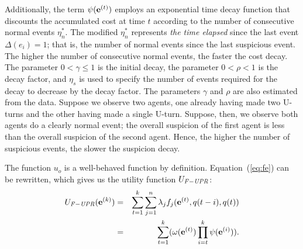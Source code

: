 Additionally, the term $\psi(\mathbf{e}^{\scriptsize(t)})$ employs an exponential time decay function that discounts the accumulated cost at time $t$ according to the number of consecutive normal events $\eta^*_n$. The modified $\eta^*_n$ represents \emph{the time elapsed} since the last  event $\Delta(e_i) = 1$; that is, the number of normal events since the last suspicious event. The higher the number of consecutive normal events, the faster the cost decay. The parameter $0 < \gamma \leq 1$ is the initial decay, the parameter $0 < \rho < 1$ is the decay factor, and $\eta_s$ is used to specify the number of events required for the decay to decrease by the decay factor. The parameters $\gamma$ and $\rho$ are also estimated from the data. Suppose we observe two agents, one already having made two U-turns and the other having made a single U-turn. Suppose, then, we observe both agents do a clearly normal event; the overall suspicion of the first agent is less than the overall suspicion of the second agent. Hence, the higher the number of suspicious events, the slower the suspicion decay.


The function $u_o$ is a well-behaved function by definition. Equation~(\ref{eq:fe}) can be rewritten, which gives us the utility function $U_{\mathit{F-UPR}}$: 
\begin{eqnarray}
	U_{\mathit{F-UPR}}(\mathbf{e}^{\scriptsize(k)}) &=&  \sum_{t = 1}^{k} \sum_{j = 1}^n \lambda_j f_j(\mathbf{e}^{\scriptsize(t)}, q(t-i), q(t)) \nonumber \\
	&=& \sum_{t = 1}^{k}(\omega(\mathbf{e}^{\scriptsize(t)}) \prod_{i=t}^{k} \psi(\mathbf{e}^{\scriptsize(i)})).
\end{eqnarray}

